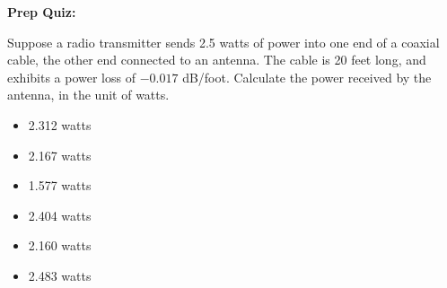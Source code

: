 \vfil \eject

\noindent
{\bf Prep Quiz:}

Suppose a radio transmitter sends 2.5 watts of power into one end of a coaxial cable, the other end connected to an antenna.  The cable is 20 feet long, and exhibits a power loss of $-0.017$ dB/foot.  Calculate the power received by the antenna, in the unit of watts.

\begin{itemize}
\item{} 2.312 watts
\vskip 5pt 
\item{} 2.167 watts
\vskip 5pt 
\item{} 1.577 watts
\vskip 5pt 
\item{} 2.404 watts
\vskip 5pt 
\item{} 2.160 watts
\vskip 5pt 
\item{} 2.483 watts
\end{itemize}






